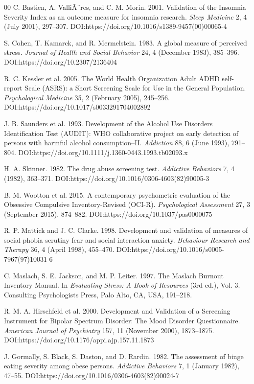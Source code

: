 ﻿\documentclass[acmsmall,screen]{acmart}
\begin{document}
\begin{thebibliography}{00}
 C. Bastien, A. ValliÃ¨res, and C. M. Morin. 2001. Validation of the Insomnia Severity Index as an outcome measure for insomnia research. \textit{Sleep Medicine} 2, 4 (July 2001), 297--307. DOI:https://doi.org/10.1016/s1389-9457(00)00065-4

 S. Cohen, T. Kamarck, and R. Mermelstein. 1983. A global measure of perceived stress. \textit{Journal of Health and Social Behavior} 24, 4 (December 1983), 385--396. DOI:https://doi.org/10.2307/2136404

 R. C. Kessler et al. 2005. The World Health Organization Adult ADHD self-report Scale (ASRS): a Short Screening Scale for Use in the General Population. \textit{Psychological Medicine} 35, 2 (February 2005), 245--256. DOI:https://doi.org/10.1017/s0033291704002892

 J. B. Saunders et al. 1993. Development of the Alcohol Use Disorders Identification Test (AUDIT): WHO collaborative project on early detection of persons with harmful alcohol consumption--II. \textit{Addiction} 88, 6 (June 1993), 791--804. DOI:https://doi.org/10.1111/j.1360-0443.1993.tb02093.x

 H. A. Skinner. 1982. The drug abuse screening test. \textit{Addictive Behaviors} 7, 4 (1982), 363--371. DOI:https://doi.org/10.1016/0306-4603(82)90005-3

 B. M. Wootton et al. 2015. A contemporary psychometric evaluation of the Obsessive Compulsive Inventory-Revised (OCI-R). \textit{Psychological Assessment} 27, 3 (September 2015), 874--882. DOI:https://doi.org/10.1037/pas0000075

 R. P. Mattick and J. C. Clarke. 1998. Development and validation of measures of social phobia scrutiny fear and social interaction anxiety. \textit{Behaviour Research and Therapy} 36, 4 (April 1998), 455--470. DOI:https://doi.org/10.1016/s0005-7967(97)10031-6

 C. Maslach, S. E. Jackson, and M. P. Leiter. 1997. The Maslach Burnout Inventory Manual. In \textit{Evaluating Stress: A Book of Resources} (3rd ed.), Vol. 3. Consulting Psychologists Press, Palo Alto, CA, USA, 191--218.

 R. M. A. Hirschfeld et al. 2000. Development and Validation of a Screening Instrument for Bipolar Spectrum Disorder: The Mood Disorder Questionnaire. \textit{American Journal of Psychiatry} 157, 11 (November 2000), 1873--1875. DOI:https://doi.org/10.1176/appi.ajp.157.11.1873

 J. Gormally, S. Black, S. Daston, and D. Rardin. 1982. The assessment of binge eating severity among obese persons. \textit{Addictive Behaviors} 7, 1 (January 1982), 47--55. DOI:https://doi.org/10.1016/0306-4603(82)90024-7

\end{thebibliography}
\end{document}
